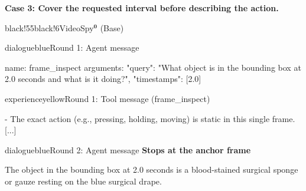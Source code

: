 \noindent\textbf{Case 3: Cover the requested interval before describing the action.}
\begin{ExecutionBox}{black!55}{black!6}{VideoSpy$^{\mathbf{0}}$ (Base)}
\raggedright
\begin{MessageBox}{dialogueblue}{Round 1: Agent message}
\begin{Trajectory}
name: frame_inspect  arguments: {"query": "What object is in the bounding box at 2.0 seconds and what is it doing?", "timestamps": [2.0]}
\end{Trajectory}
\end{MessageBox}
\begin{MessageBox}{experienceyellow}{Round 1: Tool message (frame\_inspect)}
\begin{Trajectory}
[...] - The exact action (e.g., pressing, holding, moving) is static in this single frame. [...]
\end{Trajectory}
\end{MessageBox}
\begin{MessageBox}[agent message,frame hidden,borderline={1pt}{0pt}{changeaccent,dash pattern=on 3pt off 2pt},colbacktitle=red!4]{dialogueblue}{Round 2: Agent message}
\noindent\textcolor{changeaccent}{\textbf{Stops at the anchor frame}}\par
\begin{Trajectory}
The object in the bounding box at 2.0 seconds is a blood-stained surgical sponge or gauze resting on the blue surgical drape.
\end{Trajectory}
\end{MessageBox}
\end{ExecutionBox}

